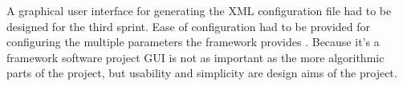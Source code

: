 A graphical user interface for generating the XML configuration file had to be designed for the third sprint.
Ease of configuration had to be provided for configuring the multiple parameters the framework provides . Because
it's a framework software project GUI is not as important as the more algorithmic parts of the project, but usability
and simplicity are design aims of the project.